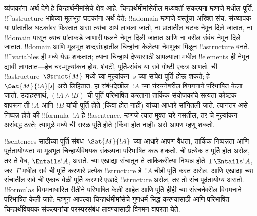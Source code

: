 \documentclass[../../../include/open-logic-section]{subfiles}
\begin{document}


व्यंजकांना अर्थ देणे हे चिन्हार्थमीमांसेचे क्षेत्र आहे. चिन्हार्थमीमांसेतील
मध्यवर्ती संकल्पना म्हणजे मधील पूर्ति. !!^a{structure}
भाषेच्या मूलभूत घटकांना अर्थ देते: !!a{domain} म्हणजे वस्तूंचा अरिक्त
संच. संख्यापक या प्रांतातील घटकांवर फिरतात असा त्यांचा अर्थ लावला जातो,
ना प्रांतातील घटक नेमून दिले जातात, ना
!!{domain} पासून त्याच प्रांताकडे जाणारी फलने नेमून दिली जातात आणि
ना वरील संबंध नेमून दिले जातात. !!{domain}
आणि मूलभूत शब्दसंग्रहातील चिन्हांना केलेल्या नेमणुका मिळून
!!a{structure} बनते.
!!^{variable}s ही मध्ये येऊ शकतात; त्यांना चिन्हार्थ देण्यासाठी
आपल्याला मधील !!{element}s ही नेमून द्यावी लागतात---हेच
चर-मूल्यांकन होय. शेवटी, पूर्ति-संबंध या सर्व गोष्टी एकत्र आणतो.
ची !!a{structure}~$\Struct{M}$ मध्ये च्या
मूल्यांकन~$s$ च्या सापेक्ष पूर्ति होऊ शकते; हे $\Sat{M}{!A}[s]$ असे
लिहितात. हा संबंधदेखील~$!A$ च्या संरचनेवरील विगमनाने परिभाषित केला जातो.
उदाहरणार्थ, $(!A \land !B)$ ची पूर्ति परिभाषित करताना तार्किक संयोजकांचे
सत्यता-कोष्टक वापरून ती $!A$ आणि~$!B$ यांची पूर्ति होते (किंवा होत नाही)
यांच्या आधारे सांगितली जाते. त्यानंतर असे निष्पन्न होते की !!{formula}~$!A$
हे !!a{sentence}, म्हणजे त्यात मुक्त चरे नसतील, तर चे
मूल्यांकन असंबद्ध ठरते; त्यामुळे मध्ये ची
सरळ पूर्ति होते (किंवा होत नाही) असे आपण म्हणू शकतो.

!!{sentence}s साठीच्या पूर्ति-संबंध~$\Sat{M}{!A}$ च्या आधारे आपण वैधता,
तार्किक निष्पन्नता आणि पूर्ततायोग्यता या मूलभूत चिन्हार्थविषयक संकल्पना
परिभाषित करू शकतो. ची प्रत्येक त पूर्ति
होत असेल, तर ते वैध, $\Entails !A$, असते. च्या एखाद्या
संचातून ते तार्किकरीत्या निष्पन्न होते, $\Gamma \Entails !A$, जर~$\Gamma$ मधील
सर्व ची पूर्ति करणारे प्रत्येक !!{structure} हे~$!A$ चीही
पूर्ति करत असेल. आणि एखाद्या च्या संचातील सर्व
ची एकाच वेळी पूर्ति करणारे एखादे !!{structure} असेल, तर तो
संच पूर्ततायोग्य असतो. !!{formula}s विगमनाधारित रीतीने परिभाषित केली आहेत
आणि पूर्ति हीही च्या संरचनेवरील विगमनाने परिभाषित केली जाते;
म्हणून आपल्या चिन्हार्थमीमांसेचे गुणधर्म सिद्ध करण्यासाठी आणि परिभाषित
चिन्हार्थविषयक संकल्पनांचा परस्परसंबंध लावण्यासाठी विगमन वापरता येते.
\end{document}
